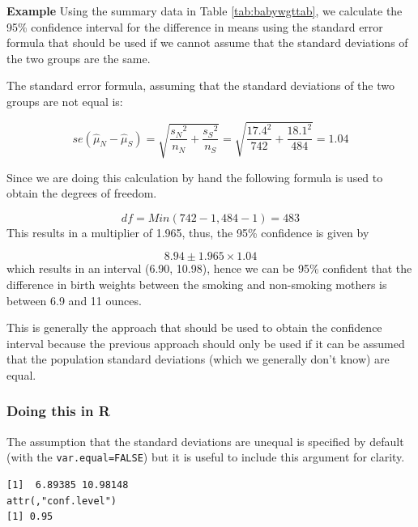 \documentclass[
  oneside]{krantz}
\newenvironment{Shaded}{\begin{snugshade}}{\end{snugshade}}
\newcommand{\AttributeTok}[1]{\textcolor[rgb]{0.77,0.63,0.00}{#1}}
\newcommand{\CommentTok}[1]{\textcolor[rgb]{0.56,0.35,0.01}{\textit{#1}}}
\newcommand{\ConstantTok}[1]{\textcolor[rgb]{0.00,0.00,0.00}{#1}}
\newcommand{\FunctionTok}[1]{\textcolor[rgb]{0.00,0.00,0.00}{#1}}
\newcommand{\NormalTok}[1]{#1}
\newcommand{\SpecialCharTok}[1]{\textcolor[rgb]{0.00,0.00,0.00}{#1}}
\begin{document}
\textbf{Example} Using the summary data in Table \ref{tab:babywgttab}, we calculate the 95\% confidence interval for the difference in means using the standard error formula that should be used if we cannot assume that the standard deviations of the two groups are the same.

The standard error formula, assuming that the standard deviations of the two groups are not equal is:

\[se(\hat{\mu}_N - \hat{\mu}_S)= \sqrt{\frac{{s_N}^2}{{n_N}} + \frac{{s_S}^2}{{n_S}}} = \sqrt{\frac{17.4^2}{742} + \frac{18.1^2}{484}} = 1.04\]

Since we are doing this calculation by hand the following formula is used to obtain the degrees of freedom.

\[df = Min(742-1, 484-1) = 483\]
This results in a multiplier of 1.965, thus, the 95\% confidence is given by

\[8.94 \pm 1.965 \times 1.04\]
which results in an interval (6.90, 10.98), hence we can be 95\% confident that the difference in birth weights between the smoking and non-smoking mothers is between 6.9 and 11 ounces.

This is generally the approach that should be used to obtain the confidence interval because the previous approach should only be used if it can be assumed that the population standard deviations (which we generally don't know) are equal.

\hypertarget{doing-this-in-r-9}{%
\subsubsection{Doing this in R}\label{doing-this-in-r-9}}

The assumption that the standard deviations are unequal is specified by default (with the \texttt{var.equal=FALSE}) but it is useful to include this argument for clarity.

\begin{Shaded}
\end{Shaded}

\begin{verbatim}
[1]  6.89385 10.98148
attr(,"conf.level")
[1] 0.95
\end{verbatim}
\end{document}
